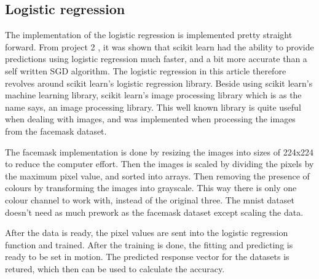 \documentclass[../main.tex]{subfiles}
\begin{document}
\subsection{Logistic regression}
The implementation of the logistic regression is implemented pretty straight forward. From project 2 \cite{project2}, it was shown that scikit learn had the ability to provide predictions using logistic regression much faster, and a bit more accurate than a self written SGD algorithm. The logistic regression in this article therefore revolves around scikit learn's logistic regression library. Beside using scikit learn's machine learning library, scikit learn's image processing library which is as the name says, an image processing library. This well known library is quite useful when dealing with images, and was implemented when processing the images from the facemask dataset.

The facemask implementation is done by resizing the images into sizes of 224x224 to reduce the computer effort. Then the images is scaled by dividing the pixels by the maximum pixel value, and sorted into arrays. Then removing the presence of colours by transforming the images into grayscale. This way there is only one colour channel to work with, instead of the original three. The mnist dataset doesn't need as much prework as the facemask dataset except scaling the data.

After the data is ready, the pixel values are sent into the logistic regression function and trained. After the training is done, the fitting and predicting is ready to be set in motion. The predicted response vector for the datasets is retured, which then can be used to calculate the accuracy.
\end{document}
